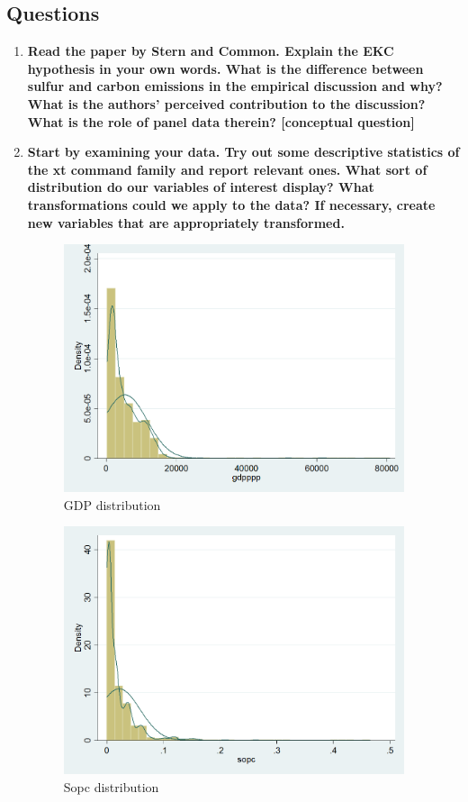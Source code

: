 \documentclass{scrartcl}
\begin{document}
	\subsection*{Questions}
	
	\begin{enumerate}
	\item \textbf{Read the paper by Stern and Common. Explain the EKC hypothesis in your own words. What is the difference between sulfur and carbon emissions in the empirical discussion and why? What is the authors' perceived contribution to the discussion? What is the role of panel data therein? [conceptual question]}
		
	\item \textbf{Start by examining your data. Try out some descriptive statistics of the xt command family and report relevant ones. What sort of distribution do our variables of interest display? What transformations could we apply to the data? If necessary, create new variables that are appropriately transformed.}
	
	

	\begin{figure}
      \includegraphics[width=10cm]{../stata/hist_gdp.png}
      \caption{GDP distribution}
    \end{figure}

	\begin{figure}
      \includegraphics[width=10cm]{../stata/hist_sopc.png}
      \caption{Sopc distribution}
    \end{figure}


\end{enumerate}
\end{document}
